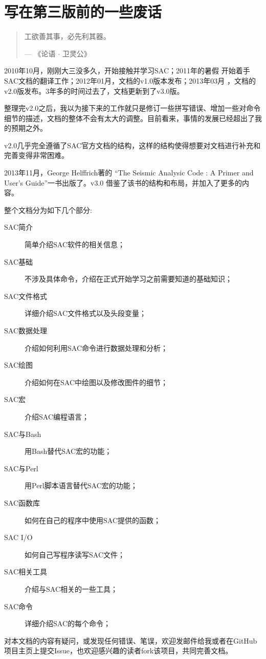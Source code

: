 \section*{\centering 写在第三版前的一些废话}

\begin{quote}
工欲善其事，必先利其器。
\begin{flushright}
--- 《论语 $\cdot$ 卫灵公》
\end{flushright}
\end{quote}

2010年10月，刚刚大三没多久，开始接触并学习SAC；2011年的暑假
开始着手SAC文档的翻译工作；2012年01月，文档的v1.0版本发布；2013年03月
，文档的v2.0版发布。3年多的时间过去了，文档更新到了v3.0版。

整理完v2.0之后，我以为接下来的工作就只是修订一些拼写错误、增加一些对命令
细节的描述，文档的整体不会有太大的调整。目前看来，事情的发展已经超出了我
的预期之外。

v2.0几乎完全遵循了SAC官方文档的结构，这样的结构使得想要对文档进行补充和
完善变得非常困难。

2013年11月，George Helffrich著的
``The Seismic Analysic Code : A Primer and User's Guide''一书出版了。v3.0
借鉴了该书的结构和布局，并加入了更多的内容。

整个文档分为如下几个部分:
\begin{description}
\item[SAC简介] 简单介绍SAC软件的相关信息；
\item[SAC基础] 不涉及具体命令，介绍在正式开始学习之前需要知道的基础知识；
\item[SAC文件格式] 详细介绍SAC文件格式以及头段变量；
\item[SAC数据处理] 介绍如何利用SAC命令进行数据处理和分析；
\item[SAC绘图] 介绍如何在SAC中绘图以及修改图件的细节；
\item[SAC宏] 介绍SAC编程语言；
\item[SAC与Bash] 用Bash替代SAC宏的功能；
\item[SAC与Perl] 用Perl脚本语言替代SAC宏的功能；
\item[SAC函数库] 如何在自己的程序中使用SAC提供的函数；
\item[SAC I/O] 如何自己写程序读写SAC文件；
\item[SAC相关工具] 介绍与SAC相关的一些工具；
\item[SAC命令] 详细介绍SAC的每个命令；
\end{description}

对本文档的内容有疑问，或发现任何错误、笔误，欢迎发邮件给我或者在GitHub
项目主页上提交Issue，也欢迎感兴趣的读者fork该项目，共同完善文档。


